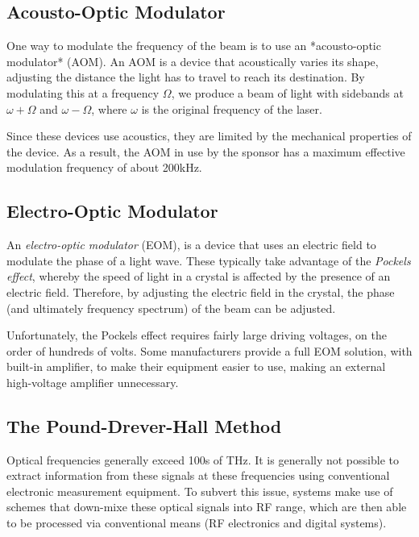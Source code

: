 \subsection{Acousto-Optic Modulator}

One way to modulate the frequency of the beam is to use an *acousto-optic modulator* (AOM).  An AOM is a device that acoustically varies its shape, adjusting the distance the light has to travel to reach its destination.  By modulating this at a frequency $\Omega$, we produce a beam of light with sidebands at $\omega + \Omega$ and $\omega - \Omega$, where $\omega$ is the original frequency of the laser.

Since these devices use acoustics, they are limited by the mechanical properties of the
device.  As a result, the AOM in use by the sponsor has a maximum effective modulation
frequency of about 200kHz.

\subsection{Electro-Optic Modulator}

An \emph{electro-optic modulator} (EOM), is a device that uses an electric field to modulate the phase of a light wave.  These typically take advantage of the \emph{Pockels effect}, whereby the speed of light in a crystal is affected by the presence of an electric field.  Therefore, by adjusting the electric field in the crystal, the phase (and ultimately frequency spectrum) of the beam can be adjusted.

Unfortunately, the Pockels effect requires fairly large driving voltages, on the order of hundreds of volts.  Some manufacturers provide a full EOM solution, with built-in amplifier, to make their equipment easier to use, making an external high-voltage amplifier unnecessary.

\subsection{The Pound-Drever-Hall Method}

Optical frequencies generally exceed 100s of THz. It is generally not possible to
extract information from these signals at these frequencies using conventional
electronic measurement equipment. To subvert this issue, systems make use of
schemes that down-mixe these optical signals into RF range, which are then
able to be processed via conventional means (RF electronics and digital systems). \\

